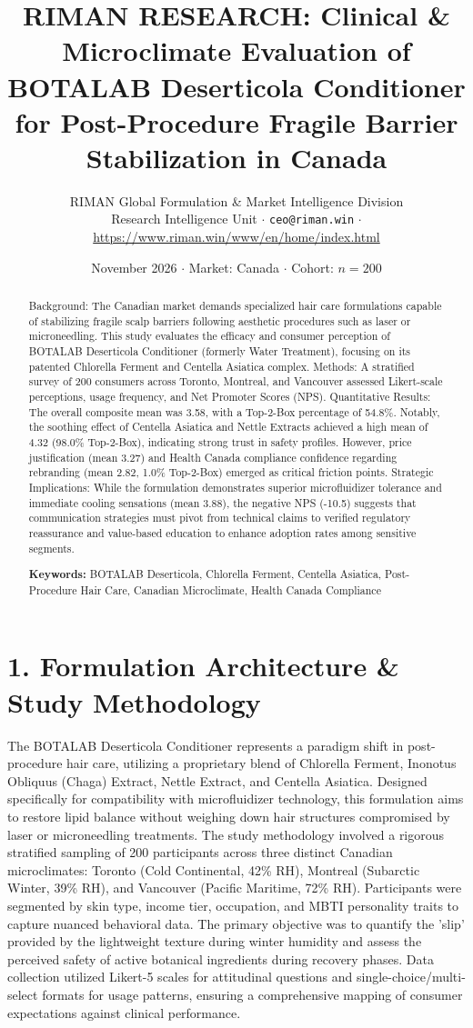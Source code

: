 \documentclass[10pt,twocolumn,a4paper]{article}
\title{\textbf{RIMAN RESEARCH: Clinical \& Microclimate Evaluation of BOTALAB Deserticola Conditioner for Post-Procedure Fragile Barrier Stabilization in Canada}}
\author{RIMAN Global Formulation \& Market Intelligence Division\\
\small Research Intelligence Unit $\cdot$ \texttt{ceo@riman.win} $\cdot$ \url{https://www.riman.win/www/en/home/index.html}}
\date{November 2026 \quad $\cdot$ \quad Market: Canada \quad $\cdot$ \quad Cohort: $n = 200$}
\begin{document}
\maketitle

\begin{abstract}
Background: The Canadian market demands specialized hair care formulations capable of stabilizing fragile scalp barriers following aesthetic procedures such as laser or microneedling. This study evaluates the efficacy and consumer perception of BOTALAB Deserticola Conditioner (formerly Water Treatment), focusing on its patented Chlorella Ferment and Centella Asiatica complex. Methods: A stratified survey of 200 consumers across Toronto, Montreal, and Vancouver assessed Likert-scale perceptions, usage frequency, and Net Promoter Scores (NPS). Quantitative Results: The overall composite mean was 3.58, with a Top-2-Box percentage of 54.8\%. Notably, the soothing effect of Centella Asiatica and Nettle Extracts achieved a high mean of 4.32 (98.0\% Top-2-Box), indicating strong trust in safety profiles. However, price justification (mean 3.27) and Health Canada compliance confidence regarding rebranding (mean 2.82, 1.0\% Top-2-Box) emerged as critical friction points. Strategic Implications: While the formulation demonstrates superior microfluidizer tolerance and immediate cooling sensations (mean 3.88), the negative NPS (-10.5) suggests that communication strategies must pivot from technical claims to verified regulatory reassurance and value-based education to enhance adoption rates among sensitive segments.

\vspace{0.4em}
\noindent\textbf{Keywords:} BOTALAB Deserticola, Chlorella Ferment, Centella Asiatica, Post-Procedure Hair Care, Canadian Microclimate, Health Canada Compliance
\end{abstract}

\section{1. Formulation Architecture \& Study Methodology}
The BOTALAB Deserticola Conditioner represents a paradigm shift in post-procedure hair care, utilizing a proprietary blend of Chlorella Ferment, Inonotus Obliquus (Chaga) Extract, Nettle Extract, and Centella Asiatica. Designed specifically for compatibility with microfluidizer technology, this formulation aims to restore lipid balance without weighing down hair structures compromised by laser or microneedling treatments. The study methodology involved a rigorous stratified sampling of 200 participants across three distinct Canadian microclimates: Toronto (Cold Continental, 42\% RH), Montreal (Subarctic Winter, 39\% RH), and Vancouver (Pacific Maritime, 72\% RH). Participants were segmented by skin type, income tier, occupation, and MBTI personality traits to capture nuanced behavioral data. The primary objective was to quantify the 'slip' provided by the lightweight texture during winter humidity and assess the perceived safety of active botanical ingredients during recovery phases. Data collection utilized Likert-5 scales for attitudinal questions and single-choice/multi-select formats for usage patterns, ensuring a comprehensive mapping of consumer expectations against clinical performance.
\end{document}
